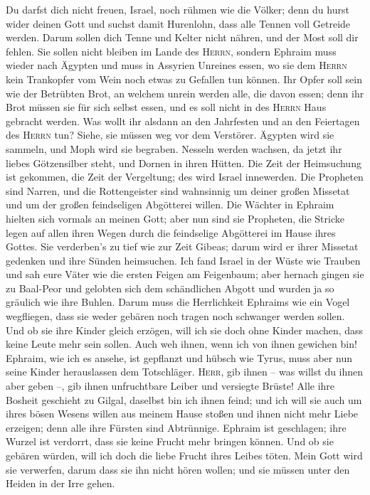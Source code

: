  Du darfst dich nicht freuen, Israel, noch rühmen wie die
Völker; denn du hurst wider deinen Gott und suchst damit Hurenlohn, dass
alle Tennen voll Getreide werden.  Darum sollen dich Tenne
und Kelter nicht nähren, und der Most soll dir fehlen. 
Sie sollen nicht bleiben im Lande des \textsc{Herrn}, sondern Ephraim
muss wieder nach Ägypten und muss in Assyrien Unreines essen,
 wo sie dem \textsc{Herrn} kein Trankopfer vom Wein noch
etwas zu Gefallen tun können. Ihr Opfer soll sein wie der Betrübten
Brot, an welchem unrein werden alle, die davon essen; denn ihr Brot
müssen sie für sich selbst essen, und es soll nicht in des
\textsc{Herrn} Haus gebracht werden.  Was wollt ihr
alsdann an den Jahrfesten und an den Feiertagen des \textsc{Herrn} tun?
 Siehe, sie müssen weg vor dem Verstörer. Ägypten wird sie
sammeln, und Moph wird sie begraben. Nesseln werden wachsen, da jetzt
ihr liebes Götzensilber steht, und Dornen in ihren Hütten.
 Die Zeit der Heimsuchung ist gekommen, die Zeit der
Vergeltung; des wird Israel innewerden. Die Propheten sind Narren, und
die Rottengeister sind wahnsinnig um deiner großen Missetat und um der
großen feindseligen Abgötterei willen.  Die Wächter in
Ephraim hielten sich vormals an meinen Gott; aber nun sind sie
Propheten, die Stricke legen auf allen ihren Wegen durch die feindselige
Abgötterei im Hause ihres Gottes.  Sie verderben's zu tief
wie zur Zeit Gibeas; darum wird er ihrer Missetat gedenken und ihre
Sünden heimsuchen.  Ich fand Israel in der Wüste wie
Trauben und sah eure Väter wie die ersten Feigen am Feigenbaum; aber
hernach gingen sie zu Baal-Peor und gelobten sich dem schändlichen
Abgott und wurden ja so gräulich wie ihre Buhlen.  Darum
muss die Herrlichkeit Ephraims wie ein Vogel wegfliegen, dass sie weder
gebären noch tragen noch schwanger werden sollen.  Und ob
sie ihre Kinder gleich erzögen, will ich sie doch ohne Kinder machen,
dass keine Leute mehr sein sollen. Auch weh ihnen, wenn ich von ihnen
gewichen bin!  Ephraim, wie ich es ansehe, ist gepflanzt
und hübsch wie Tyrus, muss aber nun seine Kinder herauslassen dem
Totschläger.  \textsc{Herr}, gib ihnen -- was willst du
ihnen aber geben --, gib ihnen unfruchtbare Leiber und versiegte Brüste!
 Alle ihre Bosheit geschieht zu Gilgal, daselbst bin ich
ihnen feind; und ich will sie auch um ihres bösen Wesens willen aus
meinem Hause stoßen und ihnen nicht mehr Liebe erzeigen; denn alle ihre
Fürsten sind Abtrünnige.  Ephraim ist geschlagen; ihre
Wurzel ist verdorrt, dass sie keine Frucht mehr bringen können. Und ob
sie gebären würden, will ich doch die liebe Frucht ihres Leibes töten.
 Mein Gott wird sie verwerfen, darum dass sie ihn nicht
hören wollen; und sie müssen unter den Heiden in der Irre gehen.

